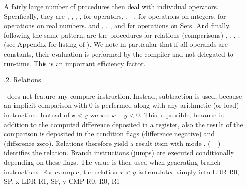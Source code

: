 
A fairly large number of procedures then deal with individual operators. Specifically, they are , , , ,  for  operators, , , ,  for operations on integers,  for operations on real numbers, and , , , and  for operations on Sets. And finally, following the same pattern, are the procedures for relations (comparisons) , , , . (see Appendix for listing of ). We note in particular that if all operands are constants, their evaluation is performed by the compiler and not delegated to run-time. This is an important efficiency factor.

.2. Relations.

\RISC\ does not feature any compare instruction. Instead, subtraction is used, because an implicit comparison with 0 is performed along with any arithmetic (or load) instruction. Instead of $x < y$ we use $x-y < 0$. This is possible, because in addition to the computed difference deposited in a register, also the result of the comparison is deposited in the condition flags  (difference negative) and  (difference zero). Relations therefore yield a result item  with mode .  (= ) identifies the relation. Branch instructions (jumps) are executed conditionally depending on these flags. The value  is then used when generating branch instructions. For example, the relation $x < y$ is translated simply into
\begintt
LDR R0, SP, x
LDR R1, SP, y
CMP R0, R0, R1
\endtt

